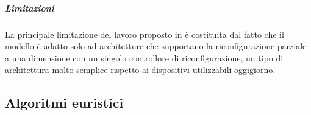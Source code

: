 \subparagraph{Limitazioni}
La principale limitazione del lavoro proposto in 
\cite{BanerjeePhysicalConstraints} è costituita dal fatto che il modello è 
adatto solo ad architetture che supportano la riconfigurazione parziale a una 
dimensione con un singolo controllore di riconfigurazione, un tipo di 
architettura molto semplice rispetto ai dispositivi utilizzabili oggigiorno.


\subsection{Algoritmi euristici}
\label{sec:algoritmiEuristici}



